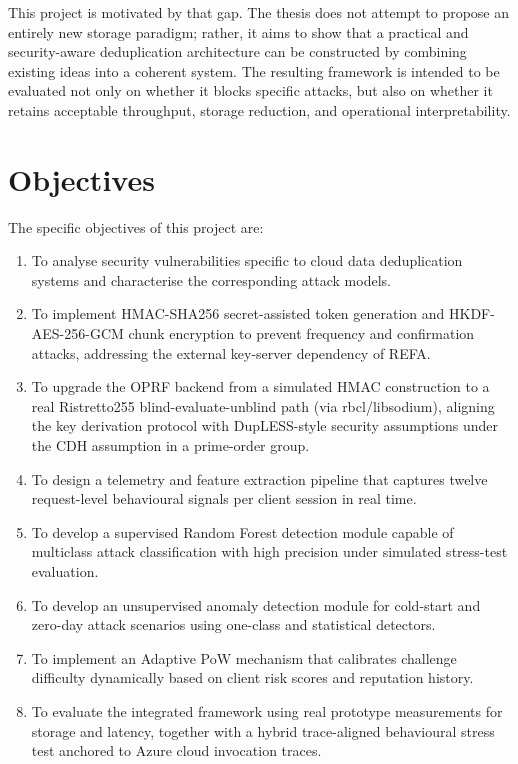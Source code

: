 \documentclass[12pt,a4paper,oneside]{report}
\begin{document}
This project is motivated by that gap.
The thesis does not attempt to propose an entirely new storage paradigm; rather, it aims to show that a practical and security-aware deduplication architecture can be constructed by combining existing ideas into a coherent system.
The resulting framework is intended to be evaluated not only on whether it blocks specific attacks, but also on whether it retains acceptable throughput, storage reduction, and operational interpretability.

\section{Objectives}

The specific objectives of this project are:

\begin{enumerate}
  \item To analyse security vulnerabilities specific to cloud data deduplication systems and characterise the corresponding attack models.
  \item To implement HMAC-SHA256 secret-assisted token generation and HKDF-AES-256-GCM chunk encryption to prevent frequency and confirmation attacks, addressing the external key-server dependency of REFA.
  \item To upgrade the OPRF backend from a simulated HMAC construction to a real Ristretto255 blind-evaluate-unblind path (via rbcl/libsodium), aligning the key derivation protocol with DupLESS-style security assumptions under the CDH assumption in a prime-order group.
  \item To design a telemetry and feature extraction pipeline that captures twelve request-level behavioural signals per client session in real time.
  \item To develop a supervised Random Forest detection module capable of multiclass attack classification with high precision under simulated stress-test evaluation.
  \item To develop an unsupervised anomaly detection module for cold-start and zero-day attack scenarios using one-class and statistical detectors.
  \item To implement an Adaptive PoW mechanism that calibrates challenge difficulty dynamically based on client risk scores and reputation history.
  \item To evaluate the integrated framework using real prototype measurements for storage and latency, together with a hybrid trace-aligned behavioural stress test anchored to Azure cloud invocation traces.
\end{enumerate}
\end{document}
